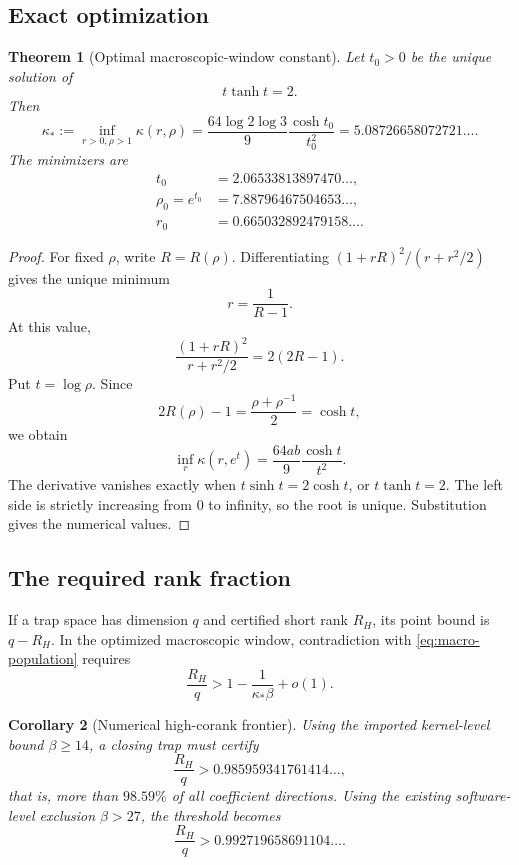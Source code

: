 \documentclass[11pt,oneside]{article}
\newtheorem{theorem}{Theorem}[section]
\newtheorem{corollary}[theorem]{Corollary}
\theoremstyle{definition}
\theoremstyle{remark}
\begin{document}
\subsection{Exact optimization}

\begin{theorem}[Optimal macroscopic-window constant]
\label{thm:kappa-opt}
Let $t_0>0$ be the unique solution of
\begin{equation}
 t\tanh t=2.
 \label{eq:t0}
\end{equation}
Then
\begin{equation}
 \kappa_*:=\inf_{r>0,\rho>1}\kappa(r,\rho)
 =\frac{64\log2\log3}{9}\frac{\cosh t_0}{t_0^2}
 =5.08726658072721\ldots.
 \label{eq:kappa-star}
\end{equation}
The minimizers are
\begin{align}
 t_0&=2.06533813897470\ldots,\label{eq:t0-num}\\
 \rho_0=e^{t_0}&=7.88796467504653\ldots,\label{eq:rho0}\\
 r_0&=0.665032892479158\ldots.
 \label{eq:r0}
\end{align}
\end{theorem}

\begin{proof}
For fixed $\rho$, write $R=R(\rho)$.  Differentiating
$(1+rR)^2/(r+r^2/2)$ gives the unique minimum
\[
 r=\frac1{R-1}.
\]
At this value,
\[
 \frac{(1+rR)^2}{r+r^2/2}=2(2R-1).
\]
Put $t=\log\rho$.  Since
\[
 2R(\rho)-1=\frac{\rho+\rho^{-1}}2=\cosh t,
\]
we obtain
\[
 \inf_r\kappa(r,e^t)=\frac{64ab}{9}\frac{\cosh t}{t^2}.
\]
The derivative vanishes exactly when $t\sinh t=2\cosh t$, or
$t\tanh t=2$.  The left side is strictly increasing from $0$ to infinity, so the root is
unique.  Substitution gives the numerical values.
\end{proof}

\subsection{The required rank fraction}

If a trap space has dimension $q$ and certified short rank $R_H$, its point bound is
$q-R_H$.  In the optimized macroscopic window, contradiction with
\eqref{eq:macro-population} requires
\begin{equation}
 \frac{R_H}{q}>1-\frac1{\kappa_*\beta}+o(1).
 \label{eq:rank-fraction}
\end{equation}

\begin{corollary}[Numerical high-corank frontier]
\label{cor:rank-frontier}
Using the imported kernel-level bound $\beta\ge14$, a closing trap must certify
\begin{equation}
 \frac{R_H}{q}>0.985959341761414\ldots,
 \label{eq:rank-kernel}
\end{equation}
that is, more than $98.59\%$ of all coefficient directions.  Using the existing
software-level exclusion $\beta>27$, the threshold becomes
\begin{equation}
 \frac{R_H}{q}>0.992719658691104\ldots.
 \label{eq:rank-software}
\end{equation}
\end{corollary}
\end{document}
